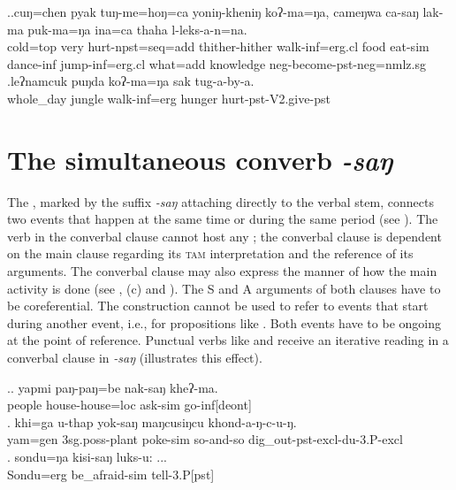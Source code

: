 \ex.\ag.\label{cungchen}cuŋ=chen   pyak  tuŋ-me=hoŋ=ca yoniŋ-kheniŋ  koʔ-ma=ŋa, cameŋwa  ca-saŋ  lak-ma      puk-ma=ŋa  ina=ca   thaha l-leks-a-n=na.\\
cold{\sc =top} very hurt{\sc -npst=seq=add} thither-hither walk{\sc -inf=erg.cl} food eat{\sc -sim} dance{\sc -inf} jump{\sc -inf=erg.cl} what{\sc =add} knowledge {\sc neg-}become{\sc -pst-neg=nmlz.sg}\\
  
\bg.leʔnamcuk     puŋda koʔ-ma=ŋa         sak    tug-a-by-a.\\
whole\_day jungle walk{\sc -inf=erg} hunger hurt{\sc [3sg]-pst-V2.give-pst}\\
 

		
\section{The simultaneous converb \emph{-saŋ}}\label{sim}
\largerpage
The , marked by the suffix \emph{-saŋ} attaching directly to the verbal stem, connects two events that happen at the same time or during the same period (see \Next[a]). The verb in the converbal clause cannot host any ; the converbal clause is dependent on the main clause regarding its \textsc{tam} interpretation and the reference of its arguments. The converbal clause may also express the manner of how the main activity is done (see \Next[b], (c) and \NNext).  The S and A arguments of both clauses have to be coreferential. The construction cannot be used to refer to events that start during another event, i.e., for propositions like . Both events have to be ongoing at the point of reference. Punctual verbs like  and  receive an iterative reading in a converbal clause in \emph{-saŋ} (\Next[b] illustrates this effect).

		 \ex.\ag. yapmi  paŋ-paŋ=be nak-saŋ kheʔ-ma.\\
		people   house-house{\sc =loc} ask{\sc -sim} go{\sc -inf[deont]}\\
	 
	\bg.	khi=ga u-thap yok-saŋ maŋcusiŋcu khond-a-ŋ-c-u-ŋ.\\
			yam{\sc =gen} {\sc 3sg.poss-}plant   poke-{\sc sim} so-and-so dig\_out{\sc -pst-excl-du-3.P-excl}\\
			  
	\bg. sondu=ŋa    kisi-saŋ             luks-u: ...\\
	Sondu{\sc =erg} be\_afraid{\sc -sim} tell{\sc -3.P[pst]}\\


